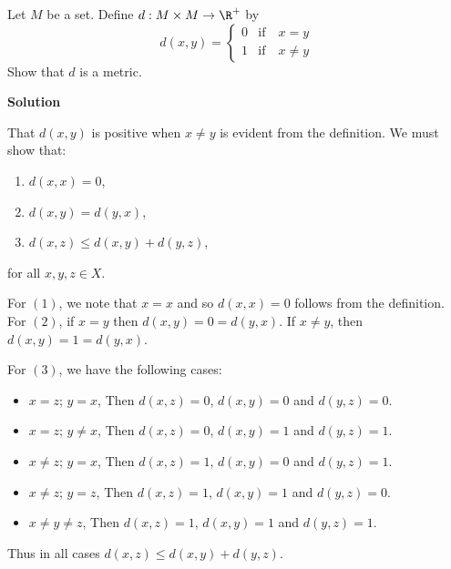 \documentclass[11pt]{amstext-l}
\newcommand{\solution}{\textbf{\large Solution}}
\begin{document}
\pagebreak
\begin{homeworkProblem}[5]
    Let $M$ be a set. Define $d : M \times M \to \R^{+}$ by  
    \begin{equation*}
	d(x,y) = \begin{cases}
	    0& \text{if}\quad x = y \\
	    1& \text{if}\quad x \neq y
	\end{cases}
    \end{equation*}
    Show that $d$ is a metric.

    \solution{}

    That $d(x,y)$ is positive when $x \neq y$ is evident from the definition. We must show that:
    \begin{enumerate}
	\item $d(x,x) = 0$,
	\item $d(x,y) = d(y,x)$,
	\item $d(x,z) \leq d(x,y) + d(y,z)$,
    \end{enumerate}
    for all $x,y,z \in X$.

    For $(1)$, we note that $x = x$ and so $d(x,x) = 0$ follows from the definition. For $(2)$, if
    $x = y$ then $d(x,y) = 0 = d(y,x)$. If $x \neq y$, then $d(x,y) = 1 = d(y,x)$.

    For $(3)$, we have the following cases:
    \begin{itemize}
	\item $x = z$; $y = x$,
	    Then $d(x,z) = 0$, $d(x,y) = 0$ and $d(y,z) = 0$.
	\item $x = z$; $y \neq x$,
	    Then $d(x,z) = 0$, $d(x,y) = 1$ and $d(y,z) = 1$.
	\item $x \neq z$; $y = x$,
	    Then $d(x,z) = 1$, $d(x,y) = 0$ and $d(y,z) = 1$. 
	\item $x \neq z$; $y = z$,
	    Then $d(x,z) = 1$, $d(x,y) = 1$ and $d(y,z) = 0$.
	\item $x \neq y \neq z$,
	    Then $d(x,z) = 1$, $d(x,y) = 1$ and $d(y,z) = 1$.
    \end{itemize}
    Thus in all cases $d(x,z) \leq d(x,y) + d(y,z)$.

\end{homeworkProblem}
\end{document}
